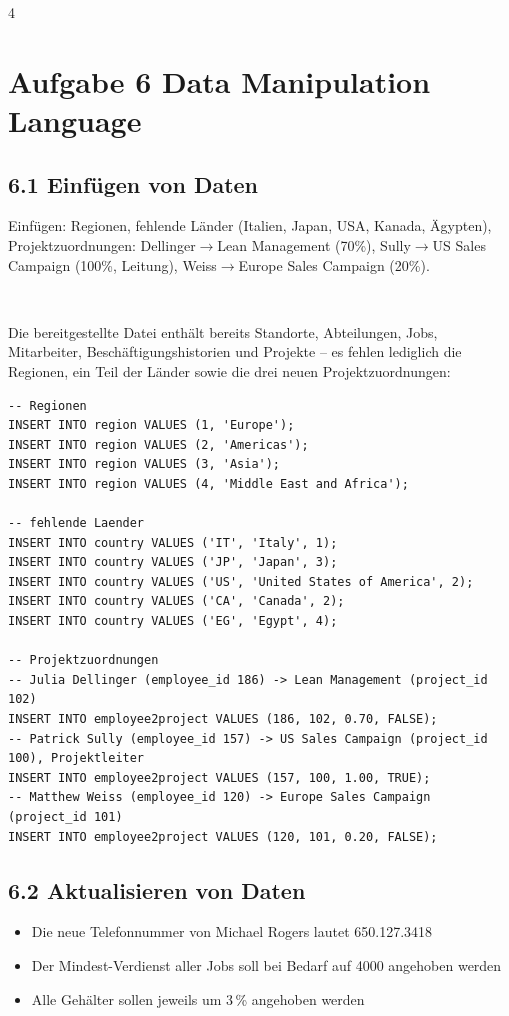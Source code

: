 \documentclass[8pt,a4paper]{extarticle}
\newcommand{\Kopf}[1]{}
\newenvironment{loesung}[1][]{%
    \par\noindent{\bfseries\color{loesungrahmen}\small$\blacktriangleright$~L\"osung#1:}~%
}{\par\smallskip}
\begin{document}
\begin{multicols}{4}
\section*{Aufgabe 6 \quad Data Manipulation Language}
\Kopf{Aufgabe 6 Data Manipulation Language}

\subsection*{6.1 \quad Einf\"ugen von Daten}
Einf\"ugen: Regionen, fehlende L\"ander (Italien, Japan, USA, Kanada, \"Agypten), Projektzuordnungen: Dellinger$\to$Lean Management (70\%), Sully$\to$US Sales Campaign (100\%, Leitung), Weiss$\to$Europe Sales Campaign (20\%).

\begin{loesung}
Die bereitgestellte Datei enth\"alt bereits Standorte, Abteilungen, Jobs, Mitarbeiter, Besch\"aftigungshistorien und Projekte -- es fehlen lediglich die Regionen, ein Teil der L\"ander sowie die drei neuen Projektzuordnungen:
\begin{lstlisting}
-- Regionen
INSERT INTO region VALUES (1, 'Europe');
INSERT INTO region VALUES (2, 'Americas');
INSERT INTO region VALUES (3, 'Asia');
INSERT INTO region VALUES (4, 'Middle East and Africa');

-- fehlende Laender
INSERT INTO country VALUES ('IT', 'Italy', 1);
INSERT INTO country VALUES ('JP', 'Japan', 3);
INSERT INTO country VALUES ('US', 'United States of America', 2);
INSERT INTO country VALUES ('CA', 'Canada', 2);
INSERT INTO country VALUES ('EG', 'Egypt', 4);

-- Projektzuordnungen
-- Julia Dellinger (employee_id 186) -> Lean Management (project_id 102)
INSERT INTO employee2project VALUES (186, 102, 0.70, FALSE);
-- Patrick Sully (employee_id 157) -> US Sales Campaign (project_id 100), Projektleiter
INSERT INTO employee2project VALUES (157, 100, 1.00, TRUE);
-- Matthew Weiss (employee_id 120) -> Europe Sales Campaign (project_id 101)
INSERT INTO employee2project VALUES (120, 101, 0.20, FALSE);
\end{lstlisting}
\end{loesung}

\subsection*{6.2 \quad Aktualisieren von Daten}
\begin{itemize}
\item Die neue Telefonnummer von Michael Rogers lautet 650.127.3418
\item Der Mindest-Verdienst aller Jobs soll bei Bedarf auf 4000 angehoben werden
\item Alle Geh\"alter sollen jeweils um 3\,\% angehoben werden
\end{itemize}


\end{multicols}
\end{document}
